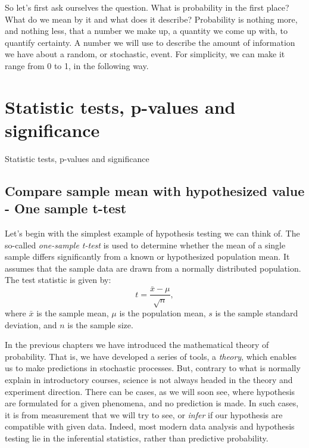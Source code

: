 \documentclass{book}
\begin{document}
So let's first ask ourselves the question. What is probability in the first place? What do we mean by it and what does it describe? Probability is nothing more, and nothing less, that a number we make up, a quantity we come up with, to quantify certainty. A number we will use to describe the amount of information we have about a random, or stochastic, event. For simplicity, we can make it range from 0 to 1, in the following way.

\newpage
\section{Statistic tests, p-values and significance}
Statistic tests, p-values and significance

\subsection{Compare sample mean with hypothesized value - One sample t-test}

Let's begin with the simplest example of hypothesis testing we can think of. The so-called \textit{one-sample t-test} is used to determine whether the mean of a single sample differs significantly from a known or hypothesized population mean. It assumes that the sample data are drawn from a normally distributed population. The test statistic is given by:
\[
    t = \frac{\bar{x} - \mu}{\sqrt{n}},
\]
where $\bar{x}$ is the sample mean, $\mu$ is the population mean, $s$ is the sample standard deviation, and $n$ is the sample size.

In the previous chapters we have introduced the mathematical theory of probability. That is, we have developed a series of tools, a \textit{theory}, which enables us to make predictions in stochastic processes. But, contrary to what is normally explain in introductory courses, science is not always headed in the theory and experiment direction. There can be cases, as we will soon see, where hypothesis are formulated for a given phenomena, and no prediction is made. In such cases, it is from measurement that we will try to see, or \textit{infer} if our hypothesis are compatible with given data. Indeed, most modern data analysis and hypothesis testing lie in the inferential statistics, rather than predictive probability.
\end{document}
